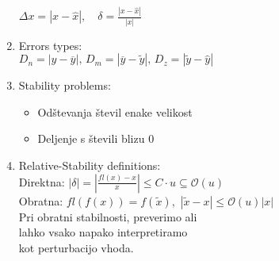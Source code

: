 \documentclass[12pt]{amsart}
\theoremstyle{plain}
\begin{document}
\begin{enumerate}
  $\Delta x = | x - \hat{x}| , \quad \delta = \frac{|x - \hat{x}|}{|x|} $
  \item Errors types: \\
  $ D_n = | y - \overline{y} |, \, D_m = | \overline{y} - \tilde{y} |, \, D_z = | \tilde{y} - \hat{y} | $
  \item Stability problems:
  \begin{itemize}
    \item Odštevanja števil enake velikost
    \item Deljenje s števili blizu 0
  \end{itemize}
  \item Relative-Stability definitions: \\
  Direktna: $ |\delta| = |\frac{fl(x) - x}{x}| \leq C \cdot u \subseteq \mathcal{O}(u) $ \\
  Obratna: $ fl(f(x)) = f(\tilde{x}), \,\, |\tilde{x} - x | \leq \mathcal{O}(u) |x|$ \\
  Pri obratni stabilnosti, preverimo ali \\
    lahko vsako napako interpretiramo \\
    kot perturbacijo vhoda.
\end{enumerate}

\newpage
\end{document}
